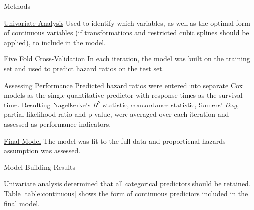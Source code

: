 \documentclass[final]{beamer}
\newlength{\onecolwid}
\newlength{\twocolwid}
\begin{document}
\begin{frame}[t]
\begin{columns}[t]
\begin{column}{\twocolwid}
\begin{columns}[t,totalwidth=\twocolwid]
\begin{column}{\onecolwid}\vspace{-.6in} %


\begin{block}{Methods}

\textcolor{dblue!70}{} \underline{Univariate Analysis} Used to identify which variables, as well as the optimal form of continuous variables (if transformations and restricted cubic splines should be applied), to include in the model.

\textcolor{dblue!70}{} \underline{Five Fold Cross-Validation} In each iteration, the model was built on the training set and used to predict hazard ratios on the test set. 

\textcolor{dblue!70}{} \underline{Assessing Performance} Predicted hazard ratios were entered into separate Cox models as the single quantitative predictor with response times as the survival time. Resulting Nagelkerke's $R^2$ statistic, concordance statistic, Somers' \textit{Dxy}, partial likelihood ratio and p-value, were averaged over each iteration and assessed as performance indicators.  

\textcolor{dblue!70}{} \underline{Final Model} The model was fit to the full data and proportional hazards assumption was assessed.

\end{block}


\begin{block}{Model Building Results}

Univariate analysis determined that all categorical predictors should be retained. Table \ref{table:continuous} shows the form of continuous predictors included in the final model. 


\end{block}
\end{column}
\end{columns}
\end{column}
\end{columns}
\end{frame}
\end{document}
